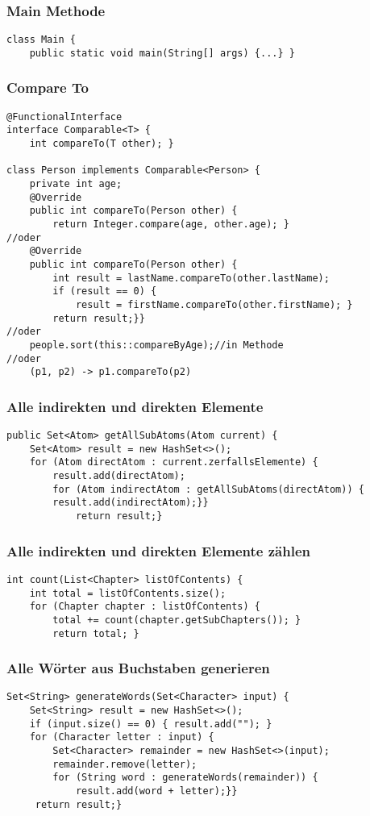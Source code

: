 \begin{multicols*}{5}
\begin{lstlisting}
		\end{lstlisting}
	\subsubsection{Main Methode}
		\begin{lstlisting}
class Main {
	public static void main(String[] args) {...} }		
		\end{lstlisting}
	\subsubsection{Compare To}
		\begin{lstlisting}
@FunctionalInterface
interface Comparable<T> {
	int compareTo(T other); }
		
class Person implements Comparable<Person> {
	private int age;
	@Override 
	public int compareTo(Person other) {
		return Integer.compare(age, other.age); }
//oder
	@Override 
	public int compareTo(Person other) {
		int result = lastName.compareTo(other.lastName);
		if (result == 0) {
			result = firstName.compareTo(other.firstName); } 
		return result;}}
//oder
	people.sort(this::compareByAge);//in Methode
//oder
	(p1, p2) -> p1.compareTo(p2)
		\end{lstlisting}
	\subsubsection{Alle indirekten und direkten Elemente}
		\begin{lstlisting}
public Set<Atom> getAllSubAtoms(Atom current) {
	Set<Atom> result = new HashSet<>();
	for (Atom directAtom : current.zerfallsElemente) {
		result.add(directAtom);
		for (Atom indirectAtom : getAllSubAtoms(directAtom)) {
		result.add(indirectAtom);}}
			return result;}
		\end{lstlisting}
	\subsubsection{Alle indirekten und direkten Elemente zählen}
		\begin{lstlisting}
int count(List<Chapter> listOfContents) { 
	int total = listOfContents.size();
	for (Chapter chapter : listOfContents) {
		total += count(chapter.getSubChapters()); }
		return total; }
		\end{lstlisting}
	\subsubsection{Alle Wörter aus Buchstaben generieren}
		\begin{lstlisting}
Set<String> generateWords(Set<Character> input) { 
	Set<String> result = new HashSet<>();
	if (input.size() == 0) { result.add(""); }
	for (Character letter : input) {
		Set<Character> remainder = new HashSet<>(input); 
		remainder.remove(letter);
		for (String word : generateWords(remainder)) {
			result.add(word + letter);}}
	 return result;}
		\end{lstlisting}

\end{multicols*}
